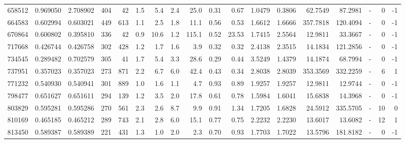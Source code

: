 \begin{tabular}{rrrrrrrrrrrrrrrlrr}
    658512 & 0.969050 &   2.708902 &  404 &   42 &      1.5 &      5.4 &     2.4 &     25.0 &       0.31 &        0.67 &  1.0479 &  0.3806 &   62.7549 &   87.2981 &             - &        0 &         -1 \\
    664583 & 0.602994 &   0.603021 &  449 &  613 &      1.1 &      2.5 &     1.8 &     11.1 &       0.56 &        0.53 &  1.6612 &  1.6666 &  357.7818 &  120.4094 &             - &        0 &         -1 \\
    670864 & 0.600802 &   0.395810 &  336 &   42 &      0.9 &     10.6 &     1.2 &    115.1 &       0.52 &       23.53 &  1.7415 &  2.5564 &   12.9811 &   33.3667 &             - &        0 &         -1 \\
    717668 & 0.426744 &   0.426758 &  302 &  428 &      1.2 &      1.7 &     1.6 &      3.9 &       0.32 &        0.32 &  2.4138 &  2.3515 &   14.1834 &  121.2856 &             - &        0 &         -1 \\
    734545 & 0.289482 &   0.702579 &  305 &   41 &      1.7 &      5.4 &     3.3 &     28.6 &       0.29 &        0.44 &  3.5249 &  1.4379 &   14.1874 &   68.7994 &             - &        0 &         -1 \\
    737951 & 0.357023 &   0.357023 &  273 &  871 &      2.2 &      6.7 &     6.0 &     42.4 &       0.43 &        0.34 &  2.8038 &  2.8039 &  353.3569 &  332.2259 &             - &        6 &          1 \\
    771232 & 0.540930 &   0.540941 &  301 &  889 &      1.0 &      1.6 &     1.1 &      4.7 &       0.93 &        0.89 &  1.9257 &  1.9257 &   12.9811 &   12.9744 &             - &        0 &         -1 \\
    798477 & 0.651627 &   0.651611 &  294 &  139 &      1.2 &      3.5 &     2.0 &     17.8 &       0.61 &        0.78 &  1.5984 &  1.6041 &   15.6838 &   14.3968 &             - &        0 &         -1 \\
    803829 & 0.595281 &   0.595286 &  270 &  561 &      2.3 &      2.6 &     8.7 &      9.9 &       0.91 &        1.34 &  1.7205 &  1.6828 &   24.5912 &  335.5705 &             - &       10 &          0 \\
    810169 & 0.465185 &   0.465212 &  289 &  743 &      2.1 &      2.8 &     6.0 &     15.1 &       0.77 &        0.75 &  2.2232 &  2.2230 &   13.6017 &   13.6082 &             - &       12 &          1 \\
    813450 & 0.589387 &   0.589389 &  221 &  431 &      1.3 &      1.0 &     2.0 &      2.3 &       0.70 &        0.93 &  1.7703 &  1.7022 &   13.5796 &  181.8182 &             - &        0 &         -1 \\

\end{tabular}
